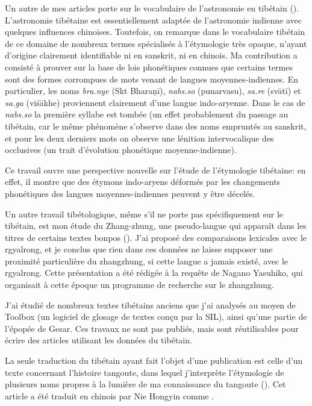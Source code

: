 \documentclass[oldfontcommands,oneside,a4paper,11pt]{memoir}
\begin{document}
Un autre de mes articles porte sur le vocabulaire de l’astronomie en tibétain (\citealt{jacques07naksatram}). L’astronomie tibétaine est essentiellement adaptée de l’astronomie indienne avec quelques influences chinoises. Toutefois, on remarque dans le vocabulaire tibétain de ce domaine de nombreux termes spécialisés à l’étymologie très opaque, n’ayant d’origine clairement identifiable ni en sanskrit, ni en chinois. Ma contribution a consisté à prouver sur la base de lois phonétiques connues que certains termes sont des formes corrompues de mots venant de langues moyennes-indiennes. En particulier, les noms \textit{bra.nye} (Skt Bharaṇī), \textit{nabs.so} (punarvasu), \textit{sa.re} (svātī) et \textit{sa.ga} (viśākhe) proviennent clairement d'une langue indo-aryenne. Dans le cas de \textit{nabs.so} la première syllabe est tombée (un effet probablement du passage au tibétain, car le même phénomène s'observe dans des noms empruntés au sanskrit, et pour les deux derniers mots on observe une lénition intervocalique des occlusives (un trait d'évolution phonétique moyenne-indienne).

Ce travail ouvre une perspective nouvelle sur l'étude de l'étymologie tibétaine: en effet, il montre que des étymons indo-aryens déformés par les changements phonétiques des langues moyennes-indiennes peuvent y être décelés.

Un autre travail tibétologique, même s'il ne porte pas spécifiquement sur le tibétain, est mon étude du Zhang-zhung, une pseudo-langue qui apparaît dans les titres de certains textes bonpos (\citealt{jacques09zz}). J'ai proposé des comparaisons lexicales avec le rgyalrong, et je conclus que rien dans ces données ne laisse supposer une proximité particulière du zhangzhung, si cette langue a jamais existé, avec le rgyalrong. Cette présentation a été rédigée à la requête de Nagano Yasuhiko, qui organisait à cette époque un programme de recherche sur le zhangzhung.

J’ai étudié de nombreux textes tibétains anciens que j’ai analysés au moyen de Toolbox (un logiciel de glosage de textes conçu par la SIL), ainsi qu'une partie de l'épopée de Gesar. Ces travaux ne sont pas publiés, mais sont réutilisables pour écrire des articles utilisant les données du tibétain.

La seule traduction du tibétain ayant fait l’objet d’une publication est celle d’un texte concernant l’histoire tangoute, dans lequel j’interprète l’étymologie de plusieurs noms propres à la lumière de ma connaissance du tangoute (\citealt{jacques08debther}). Cet article a été traduit en chinois par Nie Hongyin comme \citet{jacques08tufan}.
\end{document}
